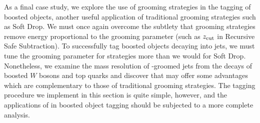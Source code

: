     As a final case study, we explore the use of \PIRANHA{} grooming strategies in the tagging of boosted objects, another useful application of traditional grooming strategies such as Soft Drop.
   We must once again overcome the subtlety that \PIRANHA{} grooming strategies remove energy proportional to the grooming parameter (such as \(z_{\rm cut}\) in Recursive Safe Subtraction).
   To successfully tag boosted objects decaying into jets, we must tune the grooming parameter for \PIRANHA{} strategies more than we would for Soft Drop.
   Nonetheless, we examine the mass resolution of \PIRANHA{}-groomed jets from the decays of boosted \(W\) bosons and top quarks and discover that \PIRANHA{} may offer some advantages which are complementary to those of traditional grooming strategies.
   The tagging procedure we implement in this section is quite simple, however, and the applications of \PIRANHA{} in boosted object tagging should be subjected to a more complete analysis.

